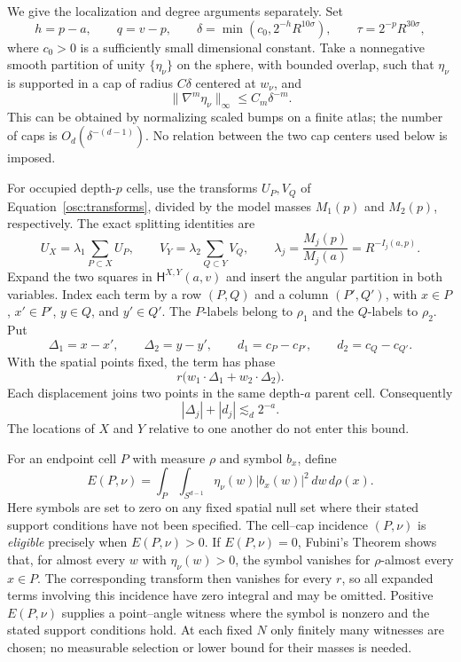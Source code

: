 We give the localization and degree arguments separately.  Set
\begin{equation}\label{graph:scales}
 h=p-a,\qquad q=v-p,\qquad
 \delta=\min(c_0,2^{-h}R^{10\sigma}),\qquad
 \tau=2^{-p}R^{30\sigma},
\end{equation}
where $c_0>0$ is a sufficiently small dimensional constant.  Take a
nonnegative smooth partition of unity $\{\eta_\nu\}$ on the sphere,
with bounded overlap, such that $\eta_\nu$ is supported in a cap of
radius $C\delta$ centered at $w_\nu$, and
\begin{equation}\label{graph:bin-derivatives}
 \|\nabla^m\eta_\nu\|_\infty\le C_m\delta^{-m}.
\end{equation}
This can be obtained by normalizing scaled bumps on a finite atlas;
the number of caps is $O_d(\delta^{-(d-1)})$.  No relation between the
two cap centers used below is imposed.

For occupied depth-$p$ cells, use the transforms $U_P,V_Q$ of
Equation~\eqref{osc:transforms}, divided by the model masses $M_1(p)$
and $M_2(p)$, respectively.  The exact splitting identities are
\begin{equation}\label{graph:splitting}
 U_X=\lambda_1\sum_{P\subset X}U_P,\qquad
 V_Y=\lambda_2\sum_{Q\subset Y}V_Q,
 \qquad \lambda_j=\frac{M_j(p)}{M_j(a)}=R^{-I_j(a,p)}.
\end{equation}
Expand the two squares in $\mathsf H^{X,Y}(a,v)$ and insert the angular
partition in both variables.  Index each term by a row $(P,Q)$ and a
column $(P',Q')$, with
$x\in P$, $x'\in P'$, $y\in Q$, and $y'\in Q'$.  The $P$-labels belong
to $\rho_1$ and the $Q$-labels to $\rho_2$.  Put
\[
 \Delta_1=x-x',\qquad \Delta_2=y-y',\qquad
 d_1=c_P-c_{P'},\qquad d_2=c_Q-c_{Q'}.
\]
With the spatial points fixed, the term has phase
\begin{equation}\label{graph:phase}
 r\big(w_1\cdot\Delta_1+w_2\cdot\Delta_2\big).
\end{equation}
Each displacement joins two points in the same depth-$a$ parent cell.
Consequently
\begin{equation}\label{graph:displacement-size}
 |\Delta_j|+|d_j|\lesssim_d2^{-a}.
\end{equation}
The locations of $X$ and $Y$ relative to one another do not enter this
bound.

For an endpoint cell $P$ with measure $\rho$ and symbol $b_x$, define
\[
 E(P,\nu)=\int_P\int_{S^{d-1}}
                  \eta_\nu(w)|b_x(w)|^2\,dw\,d\rho(x).
\]
Here symbols are set to zero on any fixed spatial null set where their
stated support conditions have not been specified.  The cell--cap
incidence $(P,\nu)$ is \emph{eligible} precisely when $E(P,\nu)>0$.
If $E(P,\nu)=0$, Fubini's Theorem shows that, for almost every $w$ with
$\eta_\nu(w)>0$, the symbol vanishes for $\rho$-almost every $x\in P$.
The corresponding transform then vanishes for every $r$, so all
expanded terms involving this incidence have zero integral and may be
omitted.  Positive $E(P,\nu)$ supplies a point--angle witness where the
symbol is nonzero and the stated support conditions hold.  At each
fixed $N$ only finitely many witnesses are chosen; no measurable
selection or lower bound for their masses is needed.

